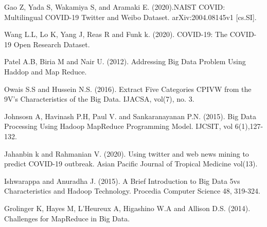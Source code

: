 \documentclass[12pt,letterpaper, twoside]{article}
\begin{document}
\begin{thebibliography}{11}
Gao Z, Yada S,  Wakamiya S, and Aramaki E. (2020).NAIST COVID: Multilingual COVID-19 Twitter and Weibo Dataset. arXiv:2004.08145v1 [cs.SI].

Wang L.L, Lo K, Yang J, Reas R and Funk k. (2020). COVID-19: The COVID-19 Open Research Dataset.

Patel A.B, Biria M and Nair U. (2012). Addressing Big Data Problem Using Haddop and Map Reduce.

Owais S.S and Hussein N.S. (2016). Extract Five Categories CPIVW from the 9V's Characteristics of the Big Data. IJACSA, vol(7), no. 3.

Johnsosn A, Havinash P.H, Paul V. and Sankaranayanan P.N. (2015). Big Data Processing Using Hadoop MapReduce Programming Model. IJCSIT, vol 6(1),127-132.

Jahanbin k and Rahmanian V. (2020). Using twitter and web news mining to predict COVID-19 outbreak. Asian Pacific Journal of Tropical Medicine vol(13). 

Ishwarappa and Anuradha J. (2015). A Brief Introduction to Big Data 5vs Characteristics and Hadoop Technology. Procedia Computer Science 48, 319-324.

Grolinger K, Hayes M, L'Heureux A, Higashino W.A and Allison D.S. (2014). Challenges for MapReduce in Big Data.
\end{thebibliography}
\end{document}
